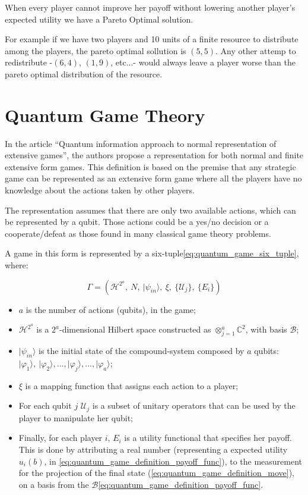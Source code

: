 When every player cannot improve her payoff without lowering another player's expected utility we have a Pareto Optimal solution.

For example if we have two players and 10 units of a finite resource to distribute among the players, the pareto optimal sollution is $(5,5)$. Any other attemp to redistribute -$(6,4)$, $(1,9)$, etc...- would always leave a player worse than the pareto optimal distribution of the resource.


\clearpage
\section{Quantum Game Theory}
\label{sec:background_quantum_game_theory}



In the article ``Quantum information approach to normal representation of extensive games''\cite{Fra2011a}, the authors propose a representation
for both normal and finite extensive form games\cite{Fra2011}. This definition is based on the premise that any strategic game can be represented as an extensive form game where all the players have no knowledge about the actions taken by other players. 

The representation assumes that there
are only two available actions, which can be represented by a qubit.
Those actions could be a yes/no decision or a cooperate/defeat as
those found in many classical game theory problems. 

A game in this
form is represented by a six-tuple\ref{eq:quantum_game_six_tuple},
where:

\begin{equation}
\Gamma=(\mathcal{H}^{2^{a}},\: N,\:\vert\psi_{in}\rangle,\:\xi,\:\{\mathcal{U}_{j}\},\:\{E_{i}\})\label{eq:quantum_game_six_tuple}
\end{equation}

\begin{itemize}
\item $a$ is the number of actions (qubits), in the game; 
\item $\mathcal{H}^{2^{a}}$ is a $2^{a}$-dimensional Hilbert space constructed
as $\otimes_{j=1}^{a}\mathbb{C}^{2}$, with basis $\mathcal{B}$;
\item $\vert\psi_{in}\rangle$ is the initial state of the compound-system
composed by $a$ qubits: $\vert\varphi_{1}\rangle,\:\vert\varphi_{2}\rangle, ..., \vert\varphi_{j}\rangle, ..., \vert\varphi_{a}\rangle$;
\item $\xi$ is a mapping function that assigns each action to a player;
\item For each qubit $j$ $\mathcal{U}_{j}$ is a subset of unitary operators
that can be used by the player to manipulate her qubit;
\item Finally, for each player $i$, $E_{i}$ is a utility functional that
specifies her payoff. This is done by attributing a real number (representing a expected utility $ u_{i}(b)$, in \ref{eq:quantum_game_definition_payoff_func}), to the measurement for the projection of the final state (\ref{eq:quantum_game_definition_move}), on a basis from the $\mathcal{B}$\ref{eq:quantum_game_definition_payoff_func}.\end{itemize}

